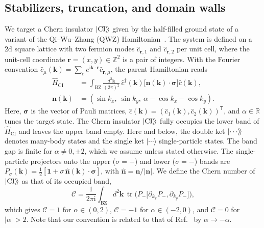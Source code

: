 \documentclass[aps,prb,10pt,twocolumn,superscriptaddress,longbibliography,floatfix]{revtex4-2}
\newcommand{\ii}{\mathrm{i}}
\newcommand{\mc}[1]{\mathcal{#1}}
\newcommand{\mr}[1]{\mathrm{#1}}
\newcommand{\Id}{\mathbf{1}}
\newcommand{\bfr}{\boldsymbol r}
\newcommand{\bk}{\boldsymbol k}
\newcommand{\kett}[1]{\ket{#1}\!\rangle}
\newcommand{\CI}{\kett{\mr{CI}}}
\begin{document}
\subsection{Stabilizers, truncation, and domain walls}
\label{sec:Stabilizers}

We target a Chern insulator $\CI$ given by the half-filled ground state of a variant of the Qi--Wu--Zhang (QWZ) Hamiltonian~\cite{QiWuZhang2006}. The system is defined on a 2d square lattice with two fermion modes $\hat c_{\bfr,1}$ and $\hat c_{\bfr,2}$ per unit cell, where the unit-cell coordinate $\bfr=(x,y)\in\mathbb Z^2$ is a pair of integers. With the Fourier convention $\hat c_\mu(\bk)=\sum_{\bfr}e^{\ii\bk\cdot\bfr}\hat c_{\bfr,\mu}$, the parent Hamiltonian reads
\begin{align}
    \hat H_{\mr{CI}}&=\int_{\mr{BZ}}\frac{d^2\bk}{(2\pi)^2}\,
    \hat c^\dagger(\bk)\big[\boldsymbol n(\bk)\cdot\boldsymbol\sigma\big]\hat c(\bk),\nonumber\\
    \boldsymbol n(\bk)&=(\sin k_x,\ \sin k_y,\ \alpha-\cos k_x-\cos k_y).
    \label{eq:QWZ}
\end{align}
Here, $\boldsymbol\sigma$ is the vector of Pauli matrices, $\hat c(\bk)=(\hat c_1(\bk),\hat c_2(\bk))^{\mathsf T}$, and $\alpha\in\mathbb R$ tunes the target state. The Chern insulator $\CI$ fully occupies the lower band of $\hat H_{\mr{CI}}$ and leaves the upper band empty.  Here and below, the double ket $\kett{\cdots}$ denotes many-body states and the single ket $|\cdots\rangle$ single-particle states. The band gap is finite for $\alpha\neq0,\pm2$, which we assume unless stated otherwise. The single-particle projectors onto the upper ($\sigma=+$) and lower ($\sigma=-$) bands are $P_\sigma(\bk)=\frac12[\Id+\sigma\,\hat{\boldsymbol n}(\bk)\cdot\boldsymbol\sigma]$, with $\hat{\boldsymbol n}=\boldsymbol n/|\boldsymbol n|$.
We define the Chern number of $\CI$ as that of its occupied band,
\begin{equation}
    \mc C=\frac{1}{2\pi\ii}\int_{\mr{BZ}}d^2\bk\,
    \operatorname{tr}\!\Big(P_-\big[\partial_{k_x}P_-,\partial_{k_y}P_-\big]\Big),
    \label{eq:ChernNumber}
\end{equation}
which gives $\mc C=1$ for $\alpha\in(0,2)$, $\mc C=-1$ for $\alpha\in(-2,0)$, and $\mc C=0$ for $|\alpha|>2$. Note that our convention is related to that of Ref.~\cite{BhuiyanPanJian2026} by $\alpha\to-\alpha$.
\end{document}
